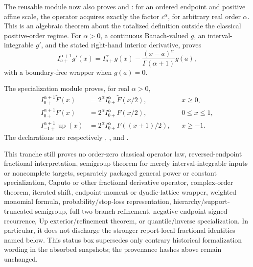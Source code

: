 \documentclass[11pt,oneside]{article}
\theoremstyle{definition}
\theoremstyle{remark}
\newcommand{\Up}{\operatorname{up}}
\newcommand{\1}{\mathbf 1}
\begin{document}
\begin{statusbox}
The reusable module  now also proves
 and
: for an ordered endpoint and positive affine
scale, the operator acquires exactly the factor $c^\alpha$, for arbitrary real order
\(\alpha\).  This is an algebraic theorem about the totalized definition outside the
classical positive-order regime.  For \(\alpha>0\), a continuous Banach-valued $g$, an
interval-integrable $g'$, and the stated right-hand interior derivative,
 proves
\begin{equation}
 I_{a+}^{\alpha+1}g'(x)
 =I_{a+}^{\alpha}g(x)
  -\frac{(x-a)^\alpha}{\Gamma(\alpha+1)}g(a),
 \label{p0:eq:fractional-volterra-order-raising}
\end{equation}
with a boundary-free wrapper when $g(a)=0$.

The specialization module  proves, for real
\(\alpha>0\),
\begin{align}
 I_{0+}^{\alpha+1}\widetilde F(x)
 &=2^\alpha I_{0+}^{\alpha}\widetilde F(x/2), &&x\ge0,
 \label{p0:eq:fractional-volterra-signed-shift}\\
 I_{0+}^{\alpha+1}F(x)
 &=2^\alpha I_{0+}^{\alpha}F(x/2), &&0\le x\le1,
 \label{p0:eq:fractional-volterra-bounded-shift}\\
 I_{-1+}^{\alpha+1}\Up(x)
 &=2^\alpha I_{0+}^{\alpha}F((x+1)/2), &&x\ge-1.
 \label{p0:eq:fractional-volterra-up-shift}
\end{align}
The declarations are respectively
,
, and
.

This tranche still proves no order-zero classical operator law, reversed-endpoint
fractional interpretation, semigroup theorem for merely interval-integrable inputs or
noncomplete targets, separately packaged general power or constant specialization, Caputo
or other fractional derivative operator, complex-order theorem, iterated shift,
endpoint-moment or dyadic-lattice wrapper, weighted monomial formula, probability/stop-loss
representation, hierarchy/support-truncated semigroup, full two-branch refinement,
negative-endpoint signed recurrence, Up exterior/refinement theorem, or quantile/inverse
specialization.  In particular, it does not discharge the stronger report-local fractional
identities named below.  This status box supersedes only contrary historical formalization
wording in the absorbed snapshots; the provenance hashes above remain unchanged.
\end{statusbox}
\end{document}
